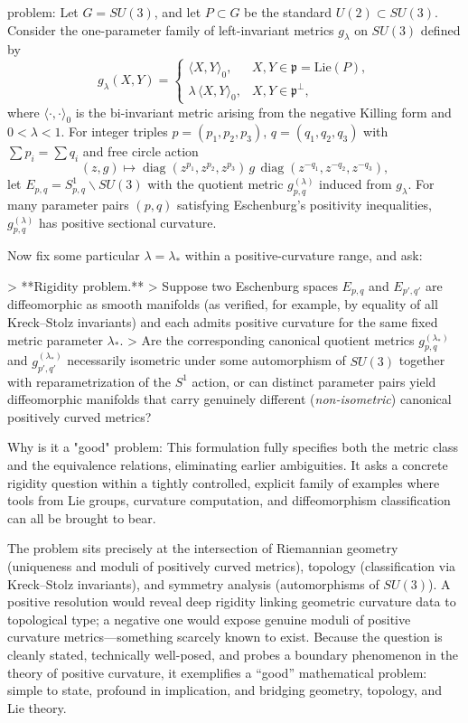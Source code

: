 problem:  
Let \(G = SU(3)\), and let \(P\subset G\) be the standard \(U(2)\subset SU(3)\).  
Consider the one-parameter family of left-invariant metrics \(g_\lambda\) on \(SU(3)\) defined by
\[
g_\lambda(X,Y) =
\begin{cases}
\langle X,Y\rangle_0, & X,Y\in \mathfrak{p} = \mathrm{Lie}(P),\\
\lambda\,\langle X,Y\rangle_0, & X,Y\in \mathfrak{p}^{\perp},
\end{cases}
\]
where \(\langle\cdot,\cdot\rangle_0\) is the bi-invariant metric arising from the negative Killing form and \(0<\lambda<1\).  
For integer triples \(p=(p_1,p_2,p_3)\), \(q=(q_1,q_2,q_3)\) with \(\sum p_i = \sum q_i\) and free circle action
\[
(z,g)\mapsto \operatorname{diag}(z^{p_1},z^{p_2},z^{p_3})\, g\, \operatorname{diag}(z^{-q_1},z^{-q_2},z^{-q_3}),
\]
let \(E_{p,q}=S^1_{p,q}\backslash SU(3)\) with the quotient metric \(g^{(\lambda)}_{p,q}\) induced from \(g_\lambda\).  
For many parameter pairs \((p,q)\) satisfying Eschenburg’s positivity inequalities, \(g^{(\lambda)}_{p,q}\) has positive sectional curvature.

Now fix some particular \(\lambda=\lambda_*\) within a positive-curvature range, and ask:

> **Rigidity problem.**  
> Suppose two Eschenburg spaces \(E_{p,q}\) and \(E_{p',q'}\) are diffeomorphic as smooth manifolds (as verified, for example, by equality of all Kreck–Stolz invariants) and each admits positive curvature for the same fixed metric parameter \(\lambda_*\).  
> Are the corresponding canonical quotient metrics \(g^{(\lambda_*)}_{p,q}\) and \(g^{(\lambda_*)}_{p',q'}\) necessarily isometric under some automorphism of \(SU(3)\) together with reparametrization of the \(S^1\) action, or can distinct parameter pairs yield diffeomorphic manifolds that carry genuinely different (\emph{non-isometric}) canonical positively curved metrics?

Why is it a "good" problem:  
This formulation fully specifies both the metric class and the equivalence relations, eliminating earlier ambiguities. It asks a concrete rigidity question within a tightly controlled, explicit family of examples where tools from Lie groups, curvature computation, and diffeomorphism classification can all be brought to bear.  

The problem sits precisely at the intersection of Riemannian geometry (uniqueness and moduli of positively curved metrics), topology (classification via Kreck–Stolz invariants), and symmetry analysis (automorphisms of \(SU(3)\)).  
A positive resolution would reveal deep rigidity linking geometric curvature data to topological type; a negative one would expose genuine moduli of positive curvature metrics—something scarcely known to exist.  
Because the question is cleanly stated, technically well-posed, and probes a boundary phenomenon in the theory of positive curvature, it exemplifies a “good” mathematical problem: simple to state, profound in implication, and bridging geometry, topology, and Lie theory.